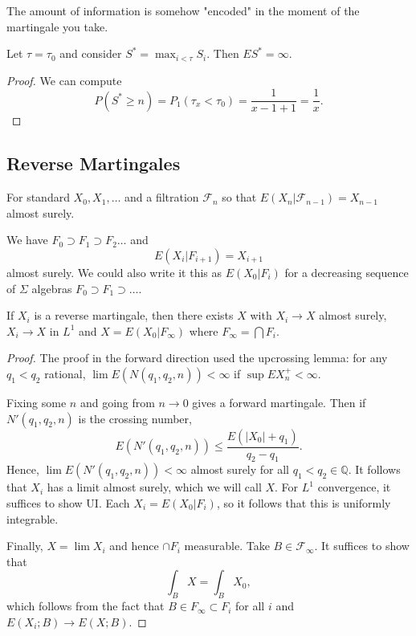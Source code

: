 \documentclass[11pt]{scrartcl}
\newcommand{\Q}{\mathbb{Q}}
\let \mc \mathcal
\begin{document}
\begin{remark} The amount of information is somehow "encoded" in the moment of the martingale you take.  
\end{remark}
\begin{corollary} Let $\tau = \tau_0$ and consider $S^* = \max_{i < \tau} S_i$.  Then $ES^* = \infty$.
\end{corollary}
\begin{proof}
We can compute 
$$P(S^* \ge n) = P_1(\tau_x < \tau_0) = \frac{1}{x-1 + 1} = \frac{1}{x}.$$
\end{proof}
\subsection{Reverse Martingales}
For standard $X_0, X_1, \dots$ and a filtration $\mc F_n$ so that $E(X_n|\mc F_{n-1}) = X_{n-1}$ almost surely.
\begin{definition} We have $F_0 \supset F_1 \supset F_2 \dots$ and 
$$E(X_i|F_{i+1}) = X_{i+1}$$
almost surely.  We could also write it this as $E(X_0|F_i)$ for a decreasing sequence of $\Sigma$ algebras $F_0 \supset F_1 \supset \dots$.
\end{definition}

\begin{lemma} If $X_i$ is a reverse martingale, then there exists $X$ with $X_i \to X$ almost surely, $X_i \to X$ in $L^1$ and $X = E(X_0|F_{\infty})$ where $F_\infty = \bigcap F_i$.
\end{lemma}
\begin{proof}
The proof in the forward direction used the upcrossing lemma: for any $q_1 < q_2$ rational, $\lim E(N(q_1, q_2, n)) < \infty$ if $\sup EX_n^+ < \infty$.

Fixing some $n$ and going from $n \to 0$ gives a forward martingale.  Then if $N'(q_1, q_2, n)$ is the crossing number, 
$$E(N'(q_1, q_2, n)) \le \frac{E(|X_0| + q_1)}{q_2 - q_1}.$$
Hence, $\lim E(N'(q_1, q_2, n)) < \infty$ almost surely for all $q_1 < q_2 \in \Q$.  It follows that $X_i$ has a limit almost surely, which we will call $X$.  For $L^1$ convergence, it suffices to show UI.  Each $X_i = E(X_0|F_i)$, so it follows that this is uniformly integrable.  

Finally, $X = \lim X_i$ and hence $\cap F_i$ measurable.  Take $B \in \mc F_\infty$.  It suffices to show that 
$$\int_B X = \int_B X_0,$$
which follows from the fact that $B \in F_\infty \subset F_i$ for all $i$ and $E(X_i;B) \to E(X;B)$.
\end{proof}
\end{document}
